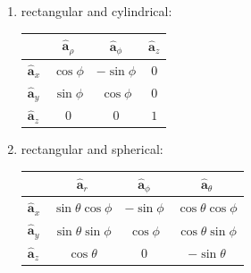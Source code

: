 \documentclass[a4paper,11pt]{article}
\newcommand{\uvec}[1]{\hat{\mathbf{a}}_{#1} }
\begin{document}
		\begin{multicols}{2}
			\begin{enumerate}
				\item rectangular and cylindrical:\\ 
				\begin{tabular} {|l|c|c|c|} \hline
					& $\uvec{\rho}$ & $\uvec{\phi}$ & $\uvec{z}$ \\ \hline
					$\uvec{x}$ & $\cos\phi$ & $-\sin\phi$ & $0$ \\ \hline
					$\uvec{y}$ & $\sin\phi$ & $\cos\phi$ & $0$ \\ \hline
					$\uvec{z}$ & $0$ & $0$ & $1$ \\ \hline
				\end{tabular}
				\item rectangular and spherical:\\ 
				\begin{tabular} {|l|c|c|c|} \hline
					& $\uvec{r}$ & $\uvec{\phi}$ & $\uvec{\theta}$ \\ \hline
					$\uvec{x}$ & $\sin\theta\cos\phi$ & $-\sin\phi$ & $\cos\theta\cos\phi$ \\ \hline
					$\uvec{y}$ & $\sin\theta\sin\phi$ & $\cos\phi$ & $\cos\theta\sin\phi$ \\ \hline
					$\uvec{z}$ & $\cos\theta$ & $0$ & $-\sin\theta$ \\ \hline
				\end{tabular}
			\end{enumerate}
		\end{multicols} 	
	
	\newpage
\end{document}
